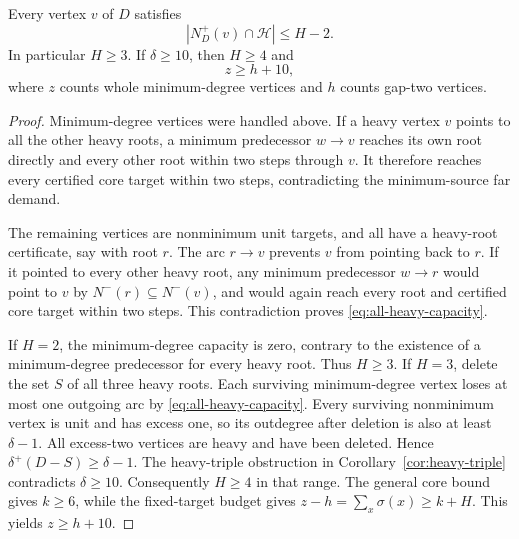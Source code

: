\begin{theorem}
\label{thm:all-heavy-capacity}
Every vertex $v$ of $D$ satisfies
\begin{equation}\label{eq:all-heavy-capacity}
 {|N_D^+(v)\cap\mathcal H|\le H-2.}
\end{equation}
In particular $H\ge3$.  If $\delta\ge10$, then $H\ge4$ and
\[
 {z\ge h+10,}
\]
where $z$ counts whole minimum-degree vertices and $h$ counts
gap-two vertices.
\end{theorem}
\begin{proof}
Minimum-degree vertices were handled above.  If a heavy vertex
$v$ points to all the other heavy roots, a minimum predecessor
$w\to v$ reaches its own root directly and every other root
within two steps through $v$.  It therefore reaches every
certified core target within two steps, contradicting the
minimum-source far demand.

The remaining vertices are nonminimum unit targets, and all
have a heavy-root certificate, say with root $r$.
The arc $r\to v$ prevents $v$ from pointing back to $r$.
If it pointed to every other heavy root, any minimum predecessor
$w\to r$ would point to $v$ by
$N^-(r)\subseteq N^-(v)$, and would again reach every root and
certified core target within two steps.  This contradiction
proves \eqref{eq:all-heavy-capacity}.

If $H=2$, the minimum-degree capacity is zero, contrary to the
existence of a minimum-degree predecessor for every heavy root.
Thus $H\ge3$.
If $H=3$, delete the set $S$ of all three heavy roots.
Each surviving minimum-degree vertex loses at most one outgoing
arc by \eqref{eq:all-heavy-capacity}.
Every surviving nonminimum vertex is unit and has excess one,
so its outdegree after deletion is also at least $\delta-1$.
All excess-two vertices are heavy and have been deleted.
Hence $\delta^+(D-S)\ge\delta-1$.
The heavy-triple obstruction in
Corollary~\ref{cor:heavy-triple} contradicts $\delta\ge10$.
Consequently $H\ge4$ in that range.
The general core bound gives $k\ge6$, while the fixed-target
budget gives
$z-h=\sum_x\sigma(x)\ge k+H$.
This yields $z\ge h+10$.
\end{proof}

